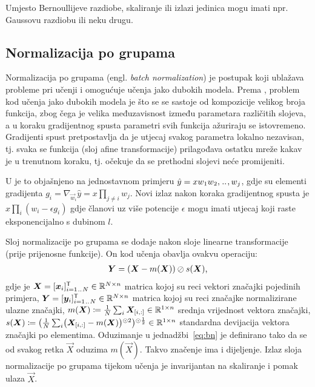 \documentclass[utf8, diplomski, lmodern]{fer}
\begin{document}
Umjesto Bernoullijeve razdiobe, skaliranje ili izlazi jedinica mogu imati npr. Gaussovu razdiobu ili neku drugu.

\subsection{Normalizacija po grupama}

Normalizacija po grupama (engl. \textit{batch normalization}) \citep{Ioffe:2015:BNADNTRUCS} je postupak koji ublažava probleme pri učenji i omogućuje učenja jako dubokih modela. Prema \citet{Goodfellow:2016:DL}, problem kod učenja jako dubokih modela je što se se sastoje od kompozicije velikog broja funkcija, zbog čega je velika međuzavisnost između parametara različitih slojeva, a u koraku gradijentnog spusta parametri svih funkcija ažuriraju se istovremeno. Gradijenti spust pretpostavlja da je utjecaj svakog parametra lokalno nezavisan, tj. svaka se funkcija (sloj afine transformacije) prilagođava ostatku mreže kakav je u trenutnom koraku, tj. očekuje da se prethodni slojevi neće promijeniti.

U \cite{Goodfellow:2016:DL} je to objašnjeno na jednostavnom primjeru $\hat y=xw_1w_2,\mkern1.5mu{..}\mkern1.5mu,w_j$, gdje su elementi gradijenta $g_i=\nabla_{\vec w_i}\hat y=x\prod_{j\neq i}w_j$. Novi izlaz nakon koraka gradijentnog spusta je $x\prod_i(w_i-\epsilon g_i)$ gdje članovi uz više potencije $\epsilon$ mogu imati utjecaj koji raste eksponencijalno s dubinom $l$.

Sloj normalizacije po grupama se dodaje nakon sloje linearne transformacije (prije prijenosne funkcije). On kod učenja obavlja ovakvu operaciju:
\begin{align} \label{eq:bn}
	\vec Y = \del{\vec X-m(\vec X)}\oslash s(\vec X) \text{,}
\end{align}
gdje je $\vec X=\sbr{\vec x_i}_{i=1\bidot N}^\tp\in\R^{N\times n}$ matrica kojoj su reci vektori značajki pojedinih primjera, $\vec Y=\sbr{\vec y_i}_{i=1\bidot N}^\tp\in\R^{N\times n}$ matrica kojoj su reci značajke normalizirane ulazne značajki, $m(\vec X)\coloneqq\frac{1}{N}\sum_i\vec X_\ind{i,:}\in\R^{1\times n}$ srednja vrijednost vektora značajki, $s(\vec X)\coloneqq\del{\frac{1}{N}\sum_i\del{\vec X_\ind{i,:}-m(\vec X)}^{\odot 2}}^{\odot\frac{1}{2}}\in\R^{1\times n}$ standardna devijacija vektora značajki po elementima. Oduzimanje u jednadžbi~\eqref{eq:bn} je definirano tako da se od svakog retka $\vec X$ oduzima $m(\vec X)$. Takvo značenje ima i dijeljenje. Izlaz sloja normalizacije po grupama tijekom učenja je invarijantan na skaliranje i pomak ulaza $\vec X$.
\end{document}
